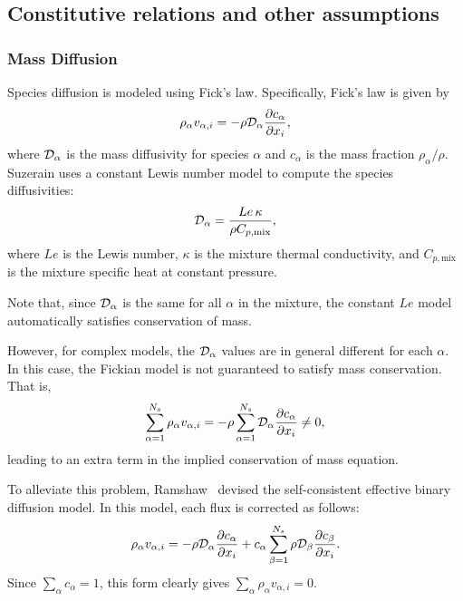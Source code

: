 \subsection{Constitutive relations and other assumptions}
\label{sec:constitutive}

\subsubsection{Mass Diffusion}
Species diffusion is modeled using Fick's law.
Specifically, Fick's law is given by
%
\begin{equation*}
\rho_{\alpha} v_{\alpha, i} = - \rho \mathcal{D}_{\alpha} \frac{\partial c_{\alpha}}{\partial x_i},
\end{equation*}
% 
where $\mathcal{D}_{\alpha}$ is the mass diffusivity for species $\alpha$
and $c_{\alpha}$ is the mass fraction $\rho_{\alpha} / \rho$.
Suzerain uses a constant Lewis number model to compute the species
diffusivities:
%
\begin{equation*}
\mathcal{D}_{\alpha} = \frac{Le \, \kappa}{\rho C_{p,\mathrm{mix}}},
\end{equation*}
%
where $Le$ is the Lewis number, $\kappa$ is the mixture thermal
conductivity, and $C_{p,\mathrm{mix}}$ is the mixture specific heat at
constant pressure.  

Note that, since $\mathcal{D}_{\alpha}$ is the same for all $\alpha$ in
the mixture, the constant $Le$ model automatically satisfies
conservation of mass.

However, for complex models, the $\mathcal{D}_{\alpha}$ values are in
general different for each $\alpha$.  In this case, the Fickian model
is not guaranteed to satisfy mass conservation.  That is,
%
\begin{equation*}
\sum_{\alpha = 1}^{N_s} \rho_{\alpha} v_{\alpha, i} = - \rho \sum_{\alpha = 1}^{N_s} \mathcal{D}_{\alpha} \frac{\partial c_{\alpha}}{\partial x_i} \neq 0,
\end{equation*}
% 
leading to an extra term in the implied conservation of mass
equation.

To alleviate this problem, Ramshaw~\cite{ramshaw90} devised the
self-consistent effective binary diffusion model.  In this model, each
flux is corrected as follows:
%
\begin{equation*}
\rho_{\alpha} v_{\alpha, i} = - \rho \mathcal{D}_{\alpha} \frac{\partial c_{\alpha}}{\partial x_i} + c_{\alpha} \sum_{\beta = 1}^{N_s} \rho \mathcal{D}_{\beta} \frac{\partial c_{\beta}}{\partial x_i}.
\end{equation*}
% 
Since $\sum_{\alpha} c_{\alpha} = 1$, this form clearly gives
$\sum_{\alpha} \rho_{\alpha} v_{\alpha,i} = 0$.

